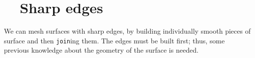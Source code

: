 



\section{~~Sharp edges}\label{\numb section 3.\numb parag 18}

We can mesh surfaces with sharp edges, by building individually smooth pieces of surface
and then {\small\tt join}ing them.
The edges must be built first;
thus, some previous knowledge about the geometry of the surface is needed.

